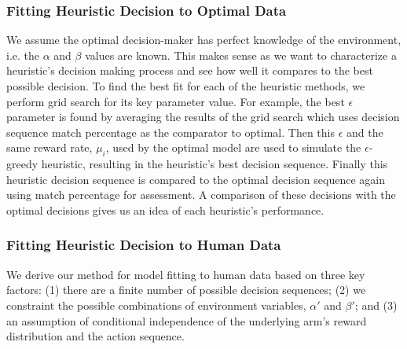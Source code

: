 \subsubsection{Fitting Heuristic Decision to Optimal Data}
We assume the optimal decision-maker has perfect knowledge of the environment, i.e. the $\alpha$ and $\beta$ values are known. This makes sense as we want to characterize a heuristic's decision making process and see how well it compares to the best possible decision. To find the best fit for each of the heuristic methods, we perform grid search for its key parameter value. For example, the best $\epsilon$ parameter is found by averaging the results of the grid search which uses decision sequence match percentage as the comparator to optimal. Then this $\epsilon$ and the same reward rate, $\mu_i$, used by the optimal model are used to simulate the $\epsilon$-greedy heuristic, resulting in the heuristic's best decision sequence. Finally this heuristic decision sequence is compared to the optimal decision sequence again using match percentage for assessment. A comparison of these decisions with the optimal decisions gives us an idea of each heuristic's performance.


\subsubsection{Fitting Heuristic Decision to Human Data}
We derive our method for model fitting to human data based on three key factors: (1) there are a finite number of possible decision sequences; (2) we constraint the possible combinations of environment variables, $\alpha'$ and $\beta'$; and (3) an assumption of conditional independence of the underlying arm's reward distribution and the action sequence.

